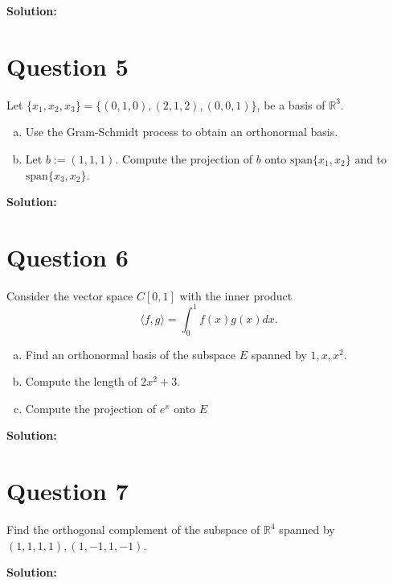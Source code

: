 \documentclass{article}
\begin{document}
\vspace{0.25cm}\noindent\textbf{Solution:}

\section*{Question 5}
Let $\{x_1, x_2, x_3\} = \{(0, 1, 0), (2, 1, 2), (0, 0, 1)\}$, be a basis of $\mathbb{R}^3$.
\begin{enumerate}[a.]
    \item Use the Gram-Schmidt process to obtain an orthonormal basis.
    \item Let $ b := (1, 1, 1) $. Compute the projection of $ b $ onto $\text{span}\{x_1, x_2\}$ and to $\text{span}\{x_3, x_2\}$.
\end{enumerate}

\vspace{0.25cm}\noindent\textbf{Solution:}

\section*{Question 6}
Consider the vector space \(C[0,1]\) with the inner product
$$ \langle f, g \rangle = \int_{0}^{1} f(x)g(x)dx. $$
\begin{enumerate}[a.]
    \item Find an orthonormal basis of the subspace \(E\) spanned by \(1, x, x^2\).
    \item Compute the length of \(2x^2 + 3\).
    \item Compute the projection of \(e^x\) onto \(E\)
\end{enumerate}

\vspace{0.25cm}\noindent\textbf{Solution:}

\section*{Question 7}
Find the orthogonal complement of the subspace of \(\mathbb{R}^4\) spanned by \((1, 1, 1, 1), (1, -1, 1, -1)\).

\vspace{0.25cm}\noindent\textbf{Solution:}
\end{document}
